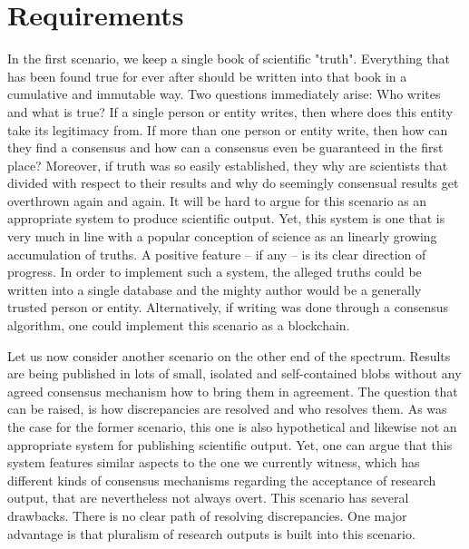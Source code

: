 \documentclass[14pt]{article}
\begin{document}


\section{Requirements}


In the first scenario, we keep a single book of scientific "truth". Everything that has been found true for ever after should be written into that book in a cumulative and immutable way. Two questions immediately arise: Who writes and what is true? If a single person or entity writes, then where does this entity take its legitimacy from. If more than one person or entity write, then how can they find a consensus and how can a consensus even be guaranteed in the first place? Moreover, if truth was so easily established, they why are scientists that divided with respect to their results and why do seemingly consensual results get overthrown again and again. It will be hard to argue for this scenario as an appropriate system to produce scientific output. Yet, this system is one that is very much in line with a popular conception of science as an linearly growing accumulation of truths. A positive feature -- if any -- is its clear direction of progress. In order to implement such a system, the alleged truths could be written into a single database and the mighty author would be a generally trusted person or entity. Alternatively, if writing was done through a consensus algorithm, one could implement this scenario as a blockchain.

Let us now consider another scenario on the other end of the spectrum. Results are being published in lots of small, isolated and self-contained blobs without any agreed consensus mechanism  how to bring them in agreement. The question that can be raised, is how discrepancies are resolved and who resolves them. As was the case for the former scenario, this one is also hypothetical and likewise not an appropriate system for publishing scientific output. Yet, one can argue that this system features similar aspects to the one we currently witness, which has different kinds of consensus mechanisms regarding the acceptance of research output, that are nevertheless not always overt. 
This scenario has several drawbacks. There is no clear path of resolving discrepancies. One major advantage is that pluralism of research outputs is built into this scenario.  
\end{document}
